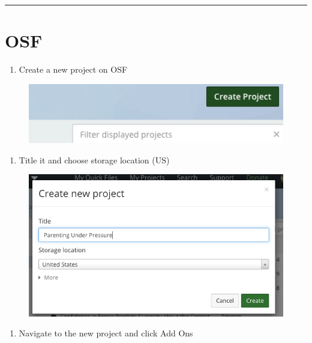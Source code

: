 \documentclass[]{book}
\providecommand{\tightlist}{%
  \setlength{\itemsep}{0pt}\setlength{\parskip}{0pt}}
\begin{document}
\begin{center}\rule{0.5\linewidth}{0.5pt}\end{center}

\section{OSF}\label{osf}

\begin{enumerate}
\def\labelenumi{\arabic{enumi}.}
\tightlist
\item
  Create a new project on OSF
\end{enumerate}

\begin{figure}
\centering
\includegraphics{images/research_protocols/osf/1.png}
\caption{}
\end{figure}

\begin{enumerate}
\def\labelenumi{\arabic{enumi}.}
\setcounter{enumi}{1}
\tightlist
\item
  Title it and choose storage location (US)
\end{enumerate}

\begin{figure}
\centering
\includegraphics{images/research_protocols/osf/2.png}
\caption{}
\end{figure}

\begin{enumerate}
\def\labelenumi{\arabic{enumi}.}
\setcounter{enumi}{2}
\tightlist
\item
  Navigate to the new project and click Add Ons
\end{enumerate}
\end{document}
